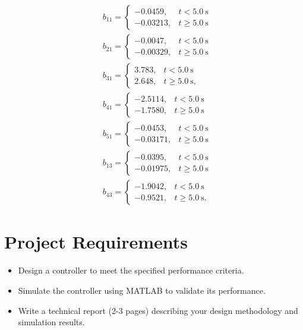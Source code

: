 \documentclass[11pt]{article}
\begin{document}
\begin{equation}
\begin{aligned}
& b_{11}= \begin{cases}-0.0459, & t<5.0 \mathrm{~s} \\
-0.03213, & t \geq 5.0 \mathrm{~s}\end{cases} \\
& b_{21}= \begin{cases}-0.0047, & t<5.0 \mathrm{~s} \\
-0.00329, & t \geq 5.0 \mathrm{~s}\end{cases} \\
& b_{31}= \begin{cases}3.783, & t<5.0 \mathrm{~s} \\
2.648, & t \geq 5.0 \mathrm{~s},\end{cases} \\
& b_{41}= \begin{cases}-2.5114, & t<5.0 \mathrm{~s} \\
-1.7580, & t \geq 5.0 \mathrm{~s}\end{cases} \\
& b_{51}= \begin{cases}-0.0453, & t<5.0 \mathrm{~s} \\
-0.03171, & t \geq 5.0 \mathrm{~s}\end{cases} \\
& b_{13}= \begin{cases}-0.0395, & t<5.0 \mathrm{~s} \\
-0.01975, & t \geq 5.0 \mathrm{~s}\end{cases} \\
& b_{43}= \begin{cases}-1.9042, & t<5.0 \mathrm{~s} \\
-0.9521, & t \geq 5.0 \mathrm{~s} .\end{cases}
\end{aligned}
\end{equation}

\section*{Project Requirements}
\begin{itemize}
    \item Design a controller to meet the specified performance criteria.
    \item Simulate the controller using MATLAB to validate its performance.
    \item Write a technical report (2-3 pages) describing your design methodology and simulation results.
\end{itemize}
\end{document}
